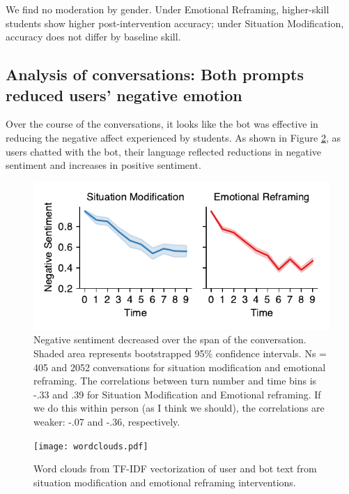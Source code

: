 \documentclass[11pt]{report}
\begin{document}
\begin{mainf}
We find no moderation by gender. 
Under Emotional Reframing, higher-skill students show higher post-intervention accuracy; under Situation Modification, accuracy does not differ by baseline skill.

\subsection*{Analysis of conversations: Both prompts reduced users' negative emotion}

Over the course of the conversations, it looks like the bot was effective in reducing the negative affect experienced by students. 
As shown in Figure \ref{fig:sentiment}, as users chatted with the bot, their language reflected reductions in negative sentiment and increases in positive sentiment.


\begin{figure}
    \centering
    \includegraphics[width=\linewidth]{sentiment.pdf}
    \caption{Negative sentiment decreased over the span of the conversation. Shaded area represents bootstrapped 95\% confidence intervals. Ns = 405 and 2052 conversations for situation modification and emotional reframing. The correlations between turn number and time bins is -.33 and .39 for Situation Modification and Emotional reframing. If we do this within person (as I think we should), the correlations are weaker: -.07 and -.36, respectively.}
    \label{fig:sentiment}
\end{figure}

\begin{figure}
    \centering
    \texttt{[image: wordclouds.pdf]}
    \caption{Word clouds from TF-IDF vectorization of user and bot text from situation modification and emotional reframing interventions.}
    \label{fig:sentiment}
\end{figure}




\end{mainf}
\end{document}
